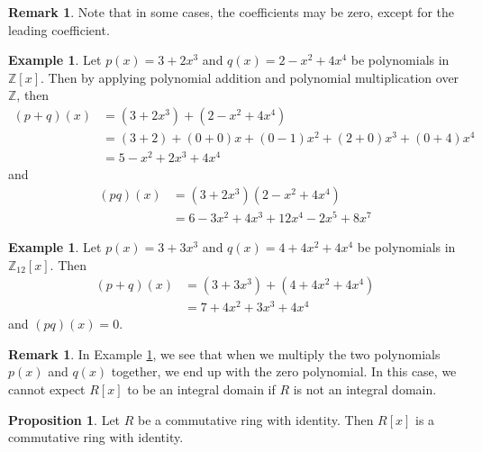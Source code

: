 \documentclass[11pt]{book}
\theoremstyle{definition}\newtheorem{definition}[subsection]{Definition}
\theoremstyle{definition}\newtheorem{example}[subsection]{Example}
\theoremstyle{definition}\newtheorem{notation}[subsection]{Notation}
\theoremstyle{definition}\newtheorem{remark}[subsection]{Remark}
\theoremstyle{theorem}\newtheorem{theorem}[subsection]{Theorem}
\theoremstyle{theorem}\newtheorem{lemma}[subsection]{Lemma}
\theoremstyle{theorem}\newtheorem{proposition}[subsection]{Proposition}
\theoremstyle{theorem}\newtheorem{corollary}[subsection]{Corollary}
\newcommand{\Z}{\mathbb{Z}}
\begin{document}
\begin{remark}\label{remark:2.1.7}
    Note that in some cases, the coefficients may be zero, except for the leading coefficient.
\end{remark}

\begin{example}\label{example:2.1.8}
    Let $p(x) = 3 + 2x^3$ and $q(x) = 2 - x^2 + 4x^4$ be polynomials in $\Z[x]$. Then by applying polynomial addition and polynomial multiplication over $\Z$, then
    \begin{align*}
        (p + q)(x) &= (3 + 2x^3) + (2 - x^2 + 4x^4) \\
        &= (3 + 2) + (0 + 0)x + (0 - 1)x^2 + (2 + 0)x^3 + (0 + 4)x^4 \\
        &= 5 - x^2 + 2x^3 + 4x^4
    \end{align*}
    and
    \begin{align*}
        (pq)(x) &= (3 + 2x^3)(2 - x^2 + 4x^4) \\
        &= 6 - 3x^2 + 4x^3 + 12x^4 - 2x^5 + 8x^7
    \end{align*}
\end{example}

\begin{example}\label{example:2.1.9}
    Let $p(x) = 3 + 3x^3$ and $q(x) = 4 + 4x^2 + 4x^4$ be polynomials in $\Z_{12}[x]$. Then
    \begin{align*}
        (p + q)(x) &= (3 + 3x^3) + (4 + 4x^2 + 4x^4) \\
        &= 7 + 4x^2 + 3x^3 + 4x^4
    \end{align*}
    and $(pq)(x) = 0$.
\end{example}

\begin{remark}\label{remark:2.1.10}
    In Example \ref{example:2.1.9}, we see that when we multiply the two polynomials $p(x)$ and $q(x)$ together, we end up with the zero polynomial. In this case, we cannot expect $R[x]$ to be an integral domain if $R$ is not an integral domain.
\end{remark}

\begin{proposition}\label{proposition:2.1.11}
    Let $R$ be a commutative ring with identity. Then $R[x]$ is a commutative ring with identity.
\end{proposition}
\end{document}
